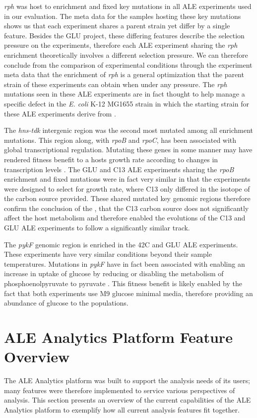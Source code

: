 \documentclass[12pt,final,masters,chapterheads]{ucsd}  %
\begin{document}
\textit{rph} was host to enrichment and fixed key mutations in all ALE experiments used in our evaluation. The meta data for the samples hosting these key mutations shows us that each experiment shares a parent strain yet differ by a single feature. Besides the GLU project, these differing features describe the selection pressure on the experiments, therefore each ALE experiment sharing the \textit{rph} enrichment theoretically involves a different selection pressure. We can therefore conclude from the comparison of experimental conditions through the experiment meta data that the enrichment of \textit{rph} is a general optimization that the parent strain of these experiments can obtain when under any pressure. The \textit{rph} mutations seen in these ALE experiments are in fact thought to help manage a specific defect in the \textit{E. coli} K-12 MG1655 strain in which the starting strain for these ALE experiments derive from \cite{Conrad2009}.

The \textit{hns-tdk} intergenic region was the second most mutated among all enrichment mutations. This region along, with \textit{rpoB} and \textit{rpoC}, has been associated with global transcriptional regulation. Mutating these genes in some manner may have rendered fitness benefit to a hosts growth rate according to changes in transcription levels \cite{Kobayashi01011990, AYERS1989749, Cheng2014, Wang1445}. The GLU and C13 ALE experiments sharing the \textit{rpoB} enrichment and fixed mutations were in fact very similar in that the experiments were designed to select for growth rate, where C13 only differed in the isotope of the carbon source provided. These shared mutated key genomic regions therefore confirm the conclusion of the \cite{pmid26964043}, that the C13 carbon source does not significantly affect the host metabolism and therefore enabled the evolutions of the C13 and GLU ALE experiments to follow a significantly similar track.

The \textit{pykF} genomic region is enriched in the 42C and GLU ALE experiments. These experiments have very similar conditions beyond their sample temperatures. Mutations in \textit{pykF} have in fact been associated with enabling an increase in uptake of glucose by reducing or disabling the metabolism of phosphoenolpyruvate to pyruvate \cite{Woods13062006, 10.1371/journal.pgen.1001164, Blank25022014}. This fitness benefit is likely enabled by the fact that both experiments use M9 glucose minimal media, therefore providing an abundance of glucose to the populations.
\section{ALE Analytics Platform Feature Overview}
The ALE Analytics platform was built to support the analysis needs of its users; many features were therefore implemented to service various perspectives of analysis. This section presents an overview of the current capabilities of the ALE Analytics platform to exemplify how all current analysis features fit together.
\end{document}

